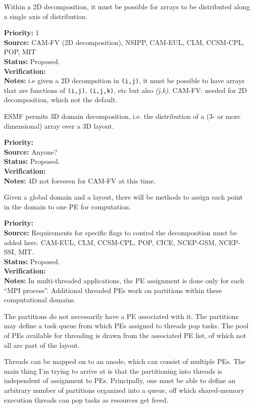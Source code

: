 Within a 2D decomposition, it must be possible for arrays to be
distributed along a single axis of distribution.

\begin{reqlist}
{\bf Priority:} 1 \\ 
{\bf Source:} CAM-FV (2D decomposition), NSIPP, CAM-EUL, CLM, CCSM-CPL, POP, MIT \\
{\bf Status:} Proposed. \\
{\bf Verification:} \\
{\bf Notes:} i.e given a 2D decompsition in \texttt{(i,j)}, it must be
  possible to have arrays that are functions of \texttt{(i,j)},
  \texttt{(i,j,k)}, etc but also \emph{(j,k)}.  CAM-FV: needed for
  2D decomposition, which not the default.
\end{reqlist}


ESMF permits 3D domain decomposition, i.e. the distribution of a
(3- or more dimensional) array over a 3D layout.

\begin{reqlist}
{\bf Priority:} \\
{\bf Source:} Anyone? \\
{\bf Status:} Proposed. \\
{\bf Verification:} \\
{\bf Notes:} 4D not foreseen for CAM-FV at this time.
\end{reqlist}


Given a global domain and a layout, there will be methods to assign
each point in the domain to one PE for computation. 

\begin{reqlist}
{\bf Priority:} \\ 
{\bf Source:} Requirements for specific flags to control the
  decomposition must be added here. CAM-EUL, CLM, CCSM-CPL, POP, CICE, NCEP-GSM, NCEP-SSI, MIT. \\
{\bf Status:} Proposed. \\
{\bf Verification:} \\
{\bf Notes:} In multi-threaded applications, the PE assignment is done
  only for each ``MPI process''. Additional threaded PEs work on
  partitions within these computational domains.
  
  The partitions do not necessarily have a PE associated with it. The
  partitions may define a task queue from which PEs assigned to
  threads pop tasks. The pool of PEs available for threading is drawn
  from the associated PE list, of which not all are part of the layout.
  
  Threads can be mapped on to an anode, which can consist of multiple
  PEs.  The main thing I'm trying to arrive at is that the
  partitioning into threads is independent of assignment to PEs.
  Principally, one must be able to define an arbitrary number of
  partitions organized into a queue, off which shared-memory execution
  threads can pop tasks as resources get freed.
\end{reqlist}

